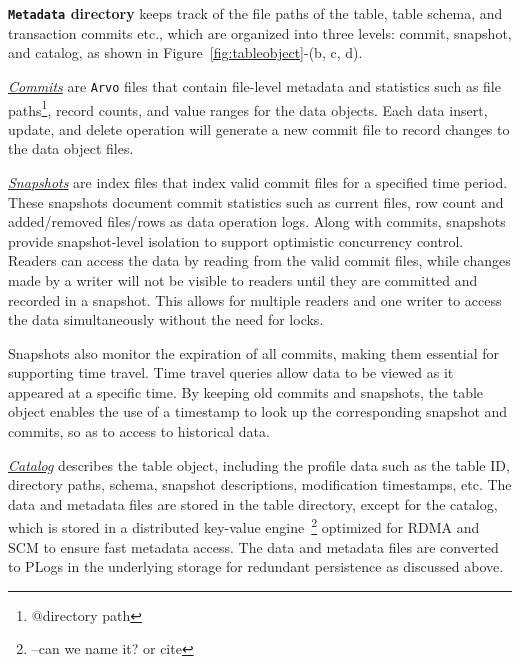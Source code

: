 \noindent \textbf{\texttt{Metadata} directory}  keeps track of the file paths of the table, table schema,  and transaction commits etc., which are organized into three levels: commit, snapshot, and catalog, as shown in Figure~\ref{fig:tableobject}-(b, c, d).

 \noindent \underline{\textit{Commits}} are \texttt{Arvo} files that contain file-level metadata and statistics such as file paths\footnote{@directory path}, record counts, and value ranges for the data objects. Each data insert, update, and delete operation will generate a new commit file to record changes to the data object files.


\noindent \underline{\textit{Snapshots}} are index files that index  valid commit files for a specified time period. These snapshots document commit statistics such as current files, row count and added/removed files/rows as data operation logs. Along with commits, snapshots provide snapshot-level isolation to support optimistic concurrency control. Readers can access the data by reading from the valid commit files, while changes made by a writer will not be visible to readers until they are committed and recorded in a snapshot. This allows for multiple readers and one writer to access the data simultaneously without the need for locks. 

Snapshots also monitor the expiration of all commits, making them essential for supporting time travel. Time travel queries allow data to be viewed as it appeared at a specific time. By keeping old commits and snapshots, the table object enables the use of a timestamp to look up the corresponding snapshot and commits, so as to access to historical data.

\noindent \underline{\textit{Catalog}}  describes the table object, including the profile data  such as the table ID, directory paths, schema, snapshot descriptions, modification timestamps, etc. The data and metadata files are stored in the table directory, except for the catalog, which is stored in a distributed key-value engine~\footnote{--can we name it? or cite} optimized for RDMA and SCM to ensure fast metadata access. The data and metadata files are converted to PLogs in the underlying storage for redundant persistence as discussed above.



